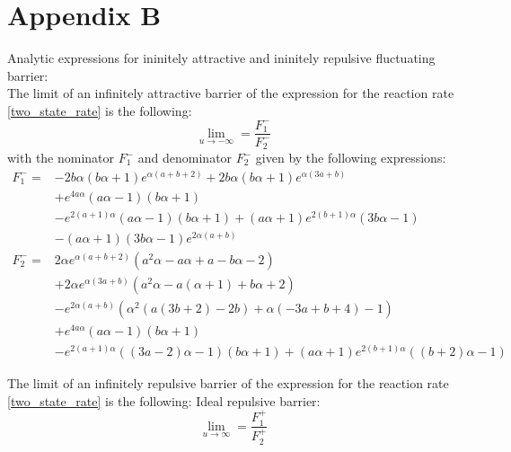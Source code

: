 \section{Appendix B}
Analytic expressions for ininitely attractive and ininitely repulsive fluctuating barrier: \\
The limit of an infinitely attractive barrier of the expression for the reaction rate \eqref{two_state_rate} is the following:
\begin{equation}
    \lim_{u \rightarrow - \infty} = \frac{F_{1}^{-}}{F_{2}^{-}}
    \label{attractive_limit}
\end{equation}
with the nominator $F_1^-$ and denominator $F_2^-$ given by the following expressions:
\begin{align}
    F_1^- = &-2 b \alpha (b \alpha+1) e^{\alpha (a+b+2)}+2 b \alpha (b \alpha+1) e^{\alpha (3 a+b)} \nonumber \\
            &+e^{4 a \alpha} (a \alpha-1) (b \alpha+1) \nonumber \\
            &-e^{2 (a+1) \alpha} (a \alpha-1) (b \alpha+1)+(a \alpha+1) e^{2 (b+1) \alpha} (3 b \alpha-1) \nonumber \\
            &-(a \alpha+1) (3 b \alpha-1) e^{2 \alpha (a+b)} \\
    F_2^- = & 2 \alpha e^{\alpha (a+b+2)} \left(a^2 \alpha-a \alpha+a-b \alpha-2\right) \nonumber \\
            &+2 \alpha e^{\alpha (3 a+b)} \left(a^2 \alpha-a (\alpha+1)+b \alpha+2\right) \nonumber \\
            &-e^{2 \alpha (a+b)} \left(\alpha^2 (a (3 b+2)-2 b)+\alpha (-3 a+b+4)-1\right) \nonumber \\
            &+e^{4 a \alpha} (a \alpha-1) (b \alpha+1) \nonumber \\
            &-e^{2 (a+1) \alpha} ((3 a-2) \alpha-1) (b \alpha+1)+(a \alpha+1) e^{2 (b+1) \alpha} ((b+2) \alpha-1)
\end{align}

The limit of an infinitely repulsive barrier of the expression for the reaction rate \eqref{two_state_rate} is the following:
Ideal repulsive barrier:
\begin{equation}
    \lim_{u \rightarrow \infty} = \frac{F_1^+}{F_2^+}
    \label{repulsive_limit}
\end{equation}

